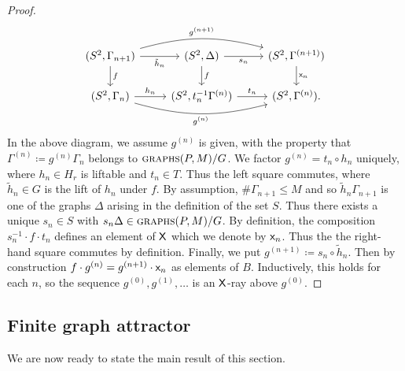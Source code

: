 \documentclass{amsart}
\theoremstyle{definition}
\theoremstyle{remark}
\newcommand{\sfX}{{\sf X}}
\newcommand{\sfx}{{\sf x}}
\newcommand{\graphs}{\text{\sc{graphs}}}
\begin{document}
\begin{proof}
  \[\begin{tikzcd}
(S^2,\Gamma_{n+1}) \arrow[d,"f"] \arrow[r,"\tilde{h}_n" below] \arrow[rr,bend left=15,"g^{(n+1)}"] &(S^2,\Delta) \arrow[d,"f"] \arrow[r,"s_n" below] & (S^2,\Gamma^{(n+1)}) \arrow[d,"\sfx_n"] \\
(S^2,\Gamma_n) \arrow[r,"h_n"] \arrow[rr,bend right=15,"g^{(n)}" below] &(S^2,t_n^{-1}\Gamma^{(n)}) \arrow[r,"t_n"] & (S^2,\Gamma^{(n)}).
\end{tikzcd}
\]
In the above diagram, we assume $g^{(n)}$ is given, with the property that $\Gamma^{(n)}\coloneqq g^{(n)}\Gamma_n$ belongs to $\graphs(P,M)/G$.  We factor  $g^{(n)}=t_n\circ h_n$ uniquely, where $h_n\in H_r$ is liftable and $t_n\in T$.  Thus the left square commutes, where $\tilde{h}_n\in G$ is the lift of $h_n$ under $f$.  By assumption, $\#\Gamma_{n+1}\leq M$ and so $\tilde{h}_n\Gamma_{n+1}$ is one of the graphs $\Delta$ arising in the definition of the set $S$.  Thus there exists a unique $s_n\in S$ with $s_n\Delta\in \graphs(P,M)/G$.  By definition, the composition $s_n^{-1}\cdot f \cdot t_n$ defines an element of $\sfX$ which we denote by $\sfx_n$.  Thus the the right-hand square commutes by definition. Finally, we put $g^{(n+1)}\coloneqq s_n\circ \tilde{h}_n$.  Then by construction $f\cdot g^{(n)}=g^{(n+1)}\cdot \sfx_n$ as elements of $B$. Inductively, this holds for each $n$, so the sequence $g^{(0)}, g^{(1)}, \ldots$ is an $\sfX$-ray above $g^{(0)}$.  
\end{proof}

\subsection{Finite graph attractor}
We are now ready to state the main result of this section. 
\end{document}
